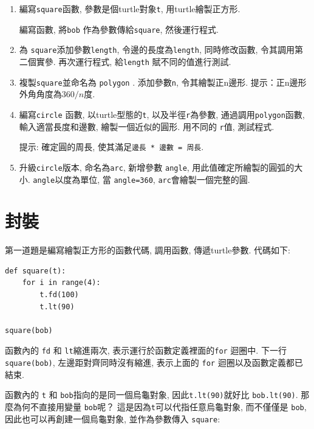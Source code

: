 \documentclass[10pt]{book}
\begin{document}
\begin{enumerate}

\item 編寫{\tt square}函數, 參數是個turtle對象{\tt t}, 用turtle繪製正方形. 

編寫函數, 將{\tt bob} 作為參數傳給{\tt square}, 然後運行程式. 

\item 為 {\tt square}添加參數{\tt length}, 令邊的長度為{\tt length}, 
同時修改函數, 令其調用第二個實參. 再次運行程式, 給{\tt length} 賦不同的值進行測試. 

\item 複製{\tt square}並命名為 {\tt polygon} . 添加參數{\tt n},
令其繪製正n邊形. 提示：正n邊形外角角度為$360/n$度. 

\item 編寫{\tt circle} 函數, 以turtle型態的{\tt t}, 以及半徑{\tt r}為參數, 
通過調用{\tt polygon}函數, 輸入適當長度和邊數, 繪製一個近似的圓形. 
用不同的 {\tt r}值, 測試程式.  

提示: 確定圓的周長, 使其滿足{\tt 邊長 * 邊數 = 周長}.

\item 升級{\tt circle}版本, 命名為{\tt arc}, 新增參數 {\tt angle}, 
用此值確定所繪製的圓弧的大小. 
 {\tt angle}以度為單位, 當 {\tt angle=360}, {\tt arc}會繪製一個完整的圓. 

\end{enumerate}


\section{封裝}

第一道題是編寫繪製正方形的函數代碼, 調用函數, 傳遞turtle參數. 
代碼如下:

\begin{verbatim}
def square(t):
    for i in range(4):
        t.fd(100)
        t.lt(90)

square(bob)
\end{verbatim}
%
函數內的 {\tt fd} 和 {\tt lt}縮進兩次, 表示運行於函數定義裡面的{\tt for} 迴圈中. 
下一行 {\tt square(bob)}, 左邊距對齊同時沒有縮進, 
表示上面的 {\tt for} 迴圈以及函數定義都已結束. 

函數內的 {\tt t} 和 {\tt bob}指向的是同一個烏龜對象, 
因此{\tt t.lt(90)}就好比 {\tt bob.lt(90)}. 
那麼為何不直接用變量 {\tt bob}呢？
這是因為{\tt t}可以代指任意烏龜對象, 而不僅僅是 {\tt bob}, 
因此也可以再創建一個烏龜對象, 並作為參數傳入 {\tt square}:
\end{document}
